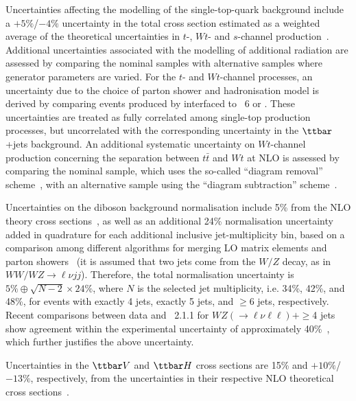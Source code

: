 Uncertainties affecting the modelling of the single-top-quark background include a 
$+5\%$/$-4\%$ uncertainty in the total cross section estimated as a weighted average 
of the theoretical uncertainties in $t$-, $Wt$- and $s$-channel production~\cite{Kidonakis:2011wy,Kidonakis:2010ux,Kidonakis:2010tc}.
Additional uncertainties associated with the modelling of additional radiation are assessed by comparing the nominal
samples with alternative samples where generator parameters are varied.
For the $t$- and $Wt$-channel processes, an uncertainty due to the choice of parton shower and hadronisation model is derived 
by comparing events produced by {\powheg} interfaced to {\pythia}~6 or {\herwigpp}.
These uncertainties are treated as fully correlated among single-top production processes, but uncorrelated with the
corresponding uncertainty in the $\ttbar$+jets background.
An additional systematic uncertainty on $Wt$-channel production concerning the separation 
between $t\bar{t}$ and $Wt$ at NLO is assessed by comparing
the nominal sample, which uses the so-called ``diagram removal'' scheme~\cite{Frixione:2008yi}, with an alternative sample
using the ``diagram subtraction'' scheme~\cite{Frixione:2008yi}.

Uncertainties on the diboson background normalisation include 5\% from the NLO theory cross sections~\cite{Campbell:1999ah},
as well as an additional 24\% normalisation uncertainty added in quadrature for each additional inclusive jet-multiplicity bin, based on a 
comparison among different algorithms for merging LO matrix elements and parton showers~\cite{Alwall:2007fs}
(it is assumed that two jets come from the $W/Z$ decay, as in $WW/WZ \to \ell \nu jj$). 
Therefore, the total normalisation uncertainty is $5\% \oplus \sqrt{N-2}\times 24\%$, where $N$ is the selected jet multiplicity,  
i.e. 34\%, 42\%, and 48\%, for events with exactly 4 jets, exactly 5 jets, and $\geq$6 jets, respectively.
Recent comparisons between data and {\sherpa}~2.1.1 for $WZ(\to \ell\nu\ell\ell) + \geq$4 jets show
agreement within the experimental uncertainty of approximately 40\%~\cite{Aaboud:2016yus}, which further justifies the above uncertainty.

Uncertainties in the $\ttbar V$ and $\ttbar H$ cross sections are 15\% and $+10\%$/$-13\%$, respectively,
from the uncertainties in their respective NLO theoretical cross sections~\cite{Campbell:2012dh,Garzelli:2012bn,Dittmaier:2011ti}. 

